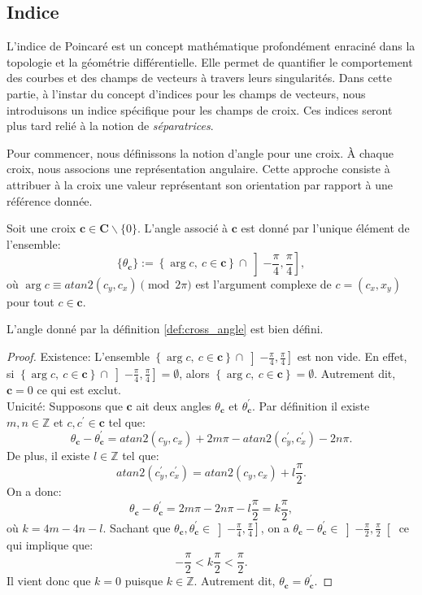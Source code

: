 \subsection{Indice}

L'indice de Poincaré est un concept mathématique profondément enraciné dans la topologie et la géométrie différentielle. Elle permet de quantifier le comportement des courbes et des champs de vecteurs à travers leurs singularités. Dans cette partie, à l'instar du concept d'indices pour les champs de vecteurs, nous introduisons un indice spécifique pour les champs de croix. Ces indices seront plus tard relié à la notion de \emph{séparatrices}.

Pour commencer, nous définissons la notion d'angle pour une croix. À chaque croix, nous associons une représentation angulaire. Cette approche consiste à attribuer à la croix une valeur représentant son orientation par rapport à une référence donnée.

\begin{definition}
    \label{def:cross_angle}
    Soit une croix $\mathbf{c}\in\mathbf{C}\backslash\{0\}$. L'angle associé à $\mathbf{c}$ est donné par l'unique élément de l'ensemble:
    $$\{\theta_{\mathbf{c}}\} := \left\{\arg c,~c\in \mathbf{c}\right\} \cap \left]-\frac{\pi}{4},\frac{\pi}{4}\right],$$
    où $\arg c\equiv atan2(c_y, c_x)\pmod{2\pi}$ est l'argument complexe de $c=(c_x, x_y)$ pour tout $c\in\mathbf{c}$.
\end{definition}

\begin{lemma}
    L'angle donné par la définition \ref{def:cross_angle} est bien défini.
\end{lemma}

\begin{proof}
    Existence: L'ensemble $\left\{\arg c,~c\in \mathbf{c}\right\} \cap \left]-\frac{\pi}{4},\frac{\pi}{4}\right]$ est non vide. En effet, si $\left\{\arg c,~c\in \mathbf{c}\right\} \cap \left]-\frac{\pi}{4},\frac{\pi}{4}\right]=\emptyset$, alors $\left\{\arg c,~c\in \mathbf{c}\right\}=\emptyset$. Autrement dit, $\mathbf{c}=0$ ce qui est exclut.\\
    Unicité: Supposons que $\mathbf{c}$ ait deux angles $\theta_{\mathbf{c}}$ et $\theta^{'}_{\mathbf{c}}$. Par définition il existe $m, n\in\mathbb{Z}$ et $c,c^{'}\in\mathbf{c}$ tel que:
    $$
    \theta_{\mathbf{c}}-\theta^{'}_{\mathbf{c}}=atan2(c_y, c_x)+2m\pi-atan2(c^{'}_y, c^{'}_x)-2n\pi.
    $$
    De plus, il existe $l\in\mathbb{Z}$ tel que:
    $$
    atan2(c^{'}_y,c^{'}_x)=atan2(c_y,c_x)+l\frac{\pi}{2}.
    $$
    On a donc:
    $$
    \theta_{\mathbf{c}}-\theta^{'}_{\mathbf{c}}=2m\pi-2n\pi-l\frac{\pi}{2}=k\frac{\pi}{2},
    $$
    où $k=4m-4n-l$.
    Sachant que $\theta_{\mathbf{c}},\theta_{\mathbf{c}}^{'}\in\left]-\frac{\pi}{4},\frac{\pi}{4}\right]$, on a $\theta_{\mathbf{c}}-\theta^{'}_{\mathbf{c}}\in\left]-\frac{\pi}{2},\frac{\pi}{2}\right[$ ce qui implique que:
    $$
    -\frac{\pi}{2}<k\frac{\pi}{2}<\frac{\pi}{2}.
    $$
    Il vient donc que $k=0$ puisque $k\in\mathbb{Z}$. Autrement dit, $\theta_{\mathbf{c}}=\theta_{\mathbf{c}}^{'}$.
\end{proof}

